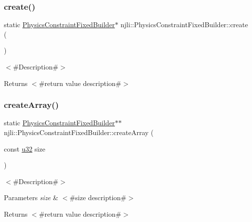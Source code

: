 \subsubsection{\texorpdfstring{create()}{create()}}
{\footnotesize\ttfamily static \mbox{\hyperlink{classnjli_1_1_physics_constraint_fixed_builder}{Physics\+Constraint\+Fixed\+Builder}}$\ast$ njli\+::\+Physics\+Constraint\+Fixed\+Builder\+::create (\begin{DoxyParamCaption}{ }\end{DoxyParamCaption})\hspace{0.3cm}{\ttfamily [static]}}

$<$\#\+Description\#$>$

\begin{DoxyReturn}{Returns}
$<$\#return value description\#$>$ 
\end{DoxyReturn}
\mbox{\label{classnjli_1_1_physics_constraint_fixed_builder_acdaeca452058b3f424b916e0c729b7c6}} 
\subsubsection{\texorpdfstring{create\+Array()}{createArray()}}
{\footnotesize\ttfamily static \mbox{\hyperlink{classnjli_1_1_physics_constraint_fixed_builder}{Physics\+Constraint\+Fixed\+Builder}}$\ast$$\ast$ njli\+::\+Physics\+Constraint\+Fixed\+Builder\+::create\+Array (\begin{DoxyParamCaption}\item[{const \mbox{\hyperlink{_util_8h_a10e94b422ef0c20dcdec20d31a1f5049}{u32}}}]{size }\end{DoxyParamCaption})\hspace{0.3cm}{\ttfamily [static]}}

$<$\#\+Description\#$>$


\begin{DoxyParams}{Parameters}
{\em size} & $<$\#size description\#$>$\\
\hline
\end{DoxyParams}
\begin{DoxyReturn}{Returns}
$<$\#return value description\#$>$ 
\end{DoxyReturn}
\mbox{\label{classnjli_1_1_physics_constraint_fixed_builder_a87f26beab39b90667c2993d411c0657f}} 
